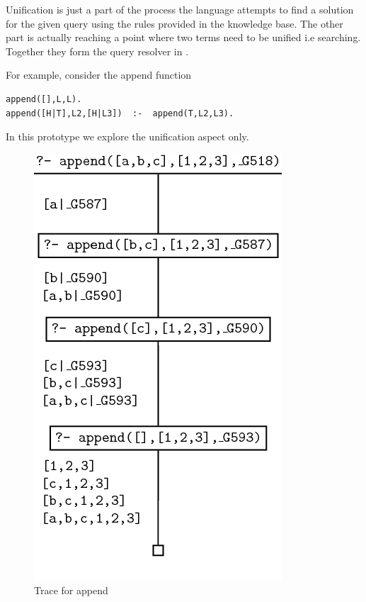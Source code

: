 \documentclass[thesis-solanki.tex]{subfiles}
\begin{document}
Unification is just a part of the process  the language
attempts to find a solution for the given query using the rules provided
in the knowledge base.
The other part is actually reaching a point where two terms need to be
unified i.e searching.
Together they form the query resolver in .

For example, consider the append function
\par
\begin{verbatim}
append([],L,L).
append([H|T],L2,[H|L3])  :-  append(T,L2,L3).
\end{verbatim}
%
In this prototype we explore the unification aspect only.



\begin{figure}
\centering
\includegraphics[scale = 0.5]{PrologAppendWorking.png}
\caption{Trace for append \cite{webiste:learnprolognowappend}}
\label{fig:Trace for append}
\end{figure}
\end{document}
